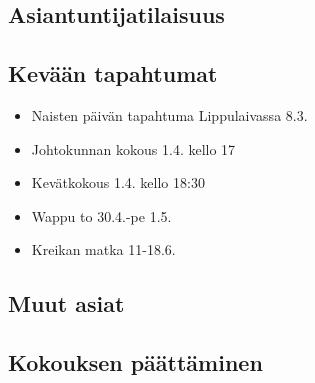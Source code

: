 \documentclass[a4paper,12pt]{article}
\begin{document}
\subsection{Asiantuntijatilaisuus}
\subsection{Kevään tapahtumat}
\begin{itemize}
\item{Naisten päivän tapahtuma Lippulaivassa} 8.3.
\item{Johtokunnan kokous} 1.4. kello 17
\item{Kevätkokous} 1.4. kello 18:30
\item{Wappu} to 30.4.-pe 1.5.
\item{Kreikan matka} 11-18.6.
\end{itemize}
\subsection{Muut asiat}
\subsection{Kokouksen päättäminen}
\end{document}
